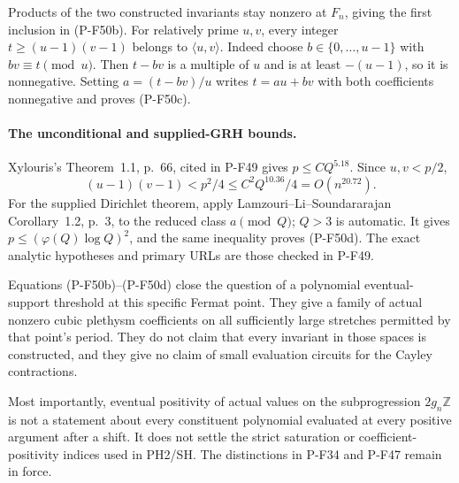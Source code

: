 \documentclass[11pt,a4paper]{article}
\begin{document}
Products of the two constructed invariants stay nonzero
at $F_n$, giving the first inclusion in (P-F50b).
For relatively prime $u,v$, every integer
$t\ge(u-1)(v-1)$ belongs to $\langle u,v\rangle$.
Indeed choose $b\in\{0,\ldots,u-1\}$ with
$bv\equiv t\pmod u$. Then $t-bv$ is a multiple of $u$
and is at least $-(u-1)$, so it is nonnegative.
Setting $a=(t-bv)/u$ writes $t=au+bv$ with both
coefficients nonnegative and proves (P-F50c).

\paragraph{The unconditional and supplied-GRH bounds.}
Xylouris's Theorem~1.1, p.~66, cited in P-F49 gives
$p\le C Q^{5.18}$. Since $u,v<p/2$,
\[
       (u-1)(v-1)<p^2/4
                      \le C^2Q^{10.36}/4=O(n^{20.72}).
                                                        \tag{P-F50r}
\]
For the supplied Dirichlet theorem, apply
Lamzouri--Li--Soundararajan Corollary~1.2, p.~3,
to the reduced class $a\pmod Q$; $Q>3$ is automatic.
It gives $p\le(\varphi(Q)\log Q)^2$, and the same
inequality proves (P-F50d). The exact analytic hypotheses
and primary URLs are those checked in P-F49.

Equations (P-F50b)--(P-F50d) close the question of a
polynomial eventual-support threshold at this specific
Fermat point. They give a family of actual nonzero
cubic plethysm coefficients on all sufficiently large
stretches permitted by that point's period. They do
not claim that every invariant in those spaces is
constructed, and they give no claim of small evaluation
circuits for the Cayley contractions.

Most importantly, eventual positivity of actual values
on the subprogression $2g_n\mathbb Z$ is not a statement
about every constituent polynomial evaluated at every
positive argument after a shift. It does not settle
the strict saturation or coefficient-positivity indices
used in PH2/SH. The distinctions in P-F34 and P-F47
remain in force.
\end{document}
